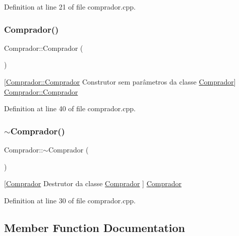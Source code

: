 Definition at line 21 of file comprador.\+cpp.

\mbox{\label{class_comprador_a83fc25fdd74fceee73944bfe801ebe08}} 
\subsubsection{\texorpdfstring{Comprador()}{Comprador()}\hspace{0.1cm}{\footnotesize\ttfamily [2/2]}}
{\footnotesize\ttfamily Comprador\+::\+Comprador (\begin{DoxyParamCaption}{ }\end{DoxyParamCaption})}

\mbox{[}\hyperlink{class_comprador_aa8494892432d46b4c8825a5b435af44d}{Comprador\+::\+Comprador} Construtor sem parâmetros da classe \hyperlink{class_comprador}{Comprador}\mbox{]}  \hyperlink{class_comprador_aa8494892432d46b4c8825a5b435af44d}{Comprador\+::\+Comprador} 

Definition at line 40 of file comprador.\+cpp.

\mbox{\label{class_comprador_a1531e2981ee8279bfc273d28a84c1e32}} 
\subsubsection{\texorpdfstring{$\sim$\+Comprador()}{~Comprador()}}
{\footnotesize\ttfamily Comprador\+::$\sim$\+Comprador (\begin{DoxyParamCaption}{ }\end{DoxyParamCaption})}

\mbox{[}\hyperlink{class_comprador}{Comprador} Destrutor da classe \hyperlink{class_comprador}{Comprador} \mbox{]}  \hyperlink{class_comprador}{Comprador} 

Definition at line 30 of file comprador.\+cpp.



\subsection{Member Function Documentation}
\mbox{\label{class_comprador_ab996419e954d24ac9c97e646e81b0c9c}} 
